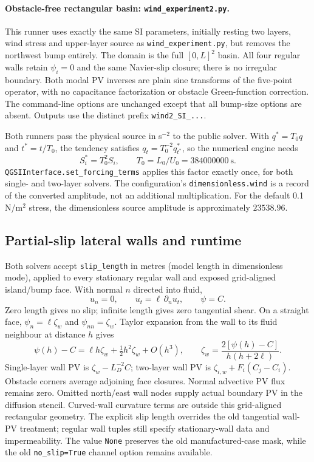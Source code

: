 \documentclass[11pt]{article}
\begin{document}
\paragraph{Obstacle-free rectangular basin: \texttt{wind\_experiment2.py}.}
This runner uses exactly the same SI parameters, initially resting two
layers, wind stress and upper-layer source as \texttt{wind\_experiment.py},
but removes the northwest bump entirely. The domain is the full
$[0,L]^2$ basin. All four regular walls retain $\psi_i=0$ and the same
Navier-slip closure; there is no irregular boundary. Both modal PV
inverses are plain sine transforms of the five-point operator, with no
capacitance factorization or obstacle Green-function correction.
The command-line options are unchanged except that all bump-size options
are absent. Outputs use the distinct prefix \texttt{wind2\_SI\_...}.

Both runners pass the physical source in s$^{-2}$ to the public solver.
With $q^*=T_0q$ and $t^*=t/T_0$, the tendency satisfies
$q_t=T_0^{-2}q^*_{t^*}$, so the numerical engine needs
\[
 S_i^*=T_0^2 S_i,\qquad T_0=L_0/U_0=384000000\ \mathrm{s}.
\]
\texttt{QGSIInterface.set\_forcing\_terms} applies this factor exactly
once, for both single- and two-layer solvers. The configuration's
\texttt{dimensionless.wind} is a record of the converted amplitude, not
an additional multiplication. For the default 0.1 N/m$^2$ stress,
the dimensionless source amplitude is approximately $23538.96$.

\subsection{Partial-slip lateral walls and runtime}

Both solvers accept \texttt{slip\_length} in metres (model length in
dimensionless mode), applied to every stationary regular wall and exposed
grid-aligned island/bump face. With normal $n$ directed into fluid,
\[
 u_n=0,\qquad u_t=\ell\,\partial_n u_t,\qquad\psi=C.
\]
Zero length gives no slip; infinite length gives zero tangential shear.
On a straight face, $\psi_n=\ell\zeta_w$ and $\psi_{nn}=\zeta_w$.
Taylor expansion from the wall to its fluid neighbour at distance $h$ gives
\[
 \psi(h)-C=\ell h\zeta_w+\tfrac12h^2\zeta_w+O(h^3),\qquad
 \zeta_w=\frac{2[\psi(h)-C]}{h(h+2\ell)}.
\]
Single-layer wall PV is $\zeta_w-L_D^{-2}C$; two-layer wall PV is
$\zeta_{i,w}+F_i(C_j-C_i)$. Obstacle corners average adjoining face
closures. Normal advective PV flux remains zero. Omitted north/east wall
nodes supply actual boundary PV in the diffusion stencil. Curved-wall
curvature terms are outside this grid-aligned rectangular geometry.
The explicit slip length overrides the old tangential wall-PV treatment;
regular wall tuples still specify stationary-wall data and impermeability.
The value \texttt{None} preserves the old manufactured-case mask, while
the old \texttt{no\_slip=True} channel option remains available.
\end{document}
